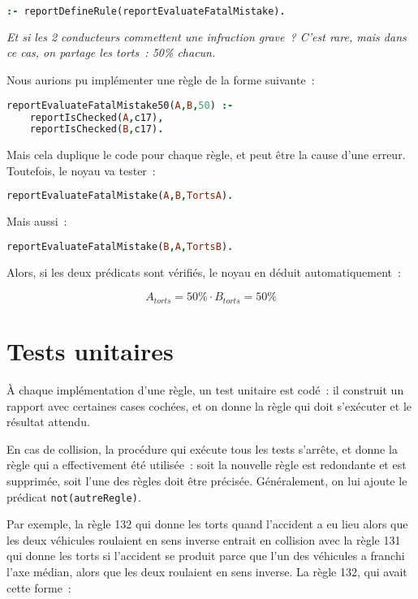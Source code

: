 \begin{lstlisting}[language=Prolog,frame=single]
:- reportDefineRule(reportEvaluateFatalMistake).
\end{lstlisting}

\textit{Et si les 2 conducteurs commettent une infraction grave~?
C'est rare, mais dans ce cas, on partage les torts~: 50\% chacun.}

Nous aurions pu implémenter une règle de la forme suivante~:

\begin{lstlisting}[language=Prolog,frame=single]
reportEvaluateFatalMistake50(A,B,50) :-
    reportIsChecked(A,c17),
    reportIsChecked(B,c17).
\end{lstlisting}

Mais cela duplique le code pour chaque règle, et peut être la cause d'une erreur. Toutefois, le noyau va tester~:

\begin{lstlisting}[language=Prolog,frame=single]
reportEvaluateFatalMistake(A,B,TortsA).
\end{lstlisting}

Mais aussi~:

\begin{lstlisting}[language=Prolog,frame=single]
reportEvaluateFatalMistake(B,A,TortsB).
\end{lstlisting}

Alors, si les deux prédicats sont vérifiés, le noyau en déduit automatiquement~:

\[A_{torts} = 50\% \cdot B_{torts} = 50\%\]

\section{Tests unitaires}

À chaque implémentation d'une règle, un test unitaire est codé~: il construit un rapport avec certaines cases cochées, et on donne la règle qui doit s'exécuter et le r\'esultat attendu.

En cas de collision, la procédure qui exécute tous les tests s'arrête, et donne la règle qui a effectivement été utilisée~: soit la nouvelle règle est redondante et est supprimée, soit l'une des règles doit être précisée. Généralement, on lui ajoute le prédicat \texttt{not(autreRegle)}.

Par exemple, la règle 132 qui donne les torts quand l'accident a eu lieu alors que les deux véhicules roulaient en sens inverse entrait en collision avec la règle 131 qui donne les torts si l'accident se produit parce que l'un des véhicules a franchi l'axe médian, alors que les deux roulaient en sens inverse.
La règle 132, qui avait cette forme~:

